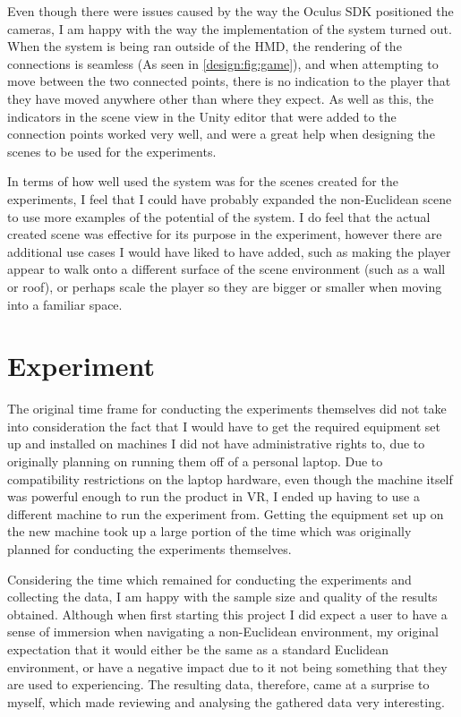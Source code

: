 		Even though there were issues caused by the way the Oculus SDK positioned the cameras, I am happy with the way the implementation of the system turned out.
		When the system is being ran outside of the HMD, the rendering of the connections is seamless (As seen in \autoref{design:fig:game}), and when attempting to move between the two connected points, there is no indication to the player that they have moved anywhere other than where they expect.
		As well as this, the indicators in the scene view in the Unity editor that were added to the connection points worked very well, and were a great help when designing the scenes to be used for the experiments.

		In terms of how well used the system was for the scenes created for the experiments, I feel that I could have probably expanded the non-Euclidean scene to use more examples of the potential of the system.
		I do feel that the actual created scene was effective for its purpose in the experiment, however there are additional use cases I would have liked to have added, such as making the player appear to walk onto a different surface of the scene environment (such as a wall or roof), or perhaps scale the player so they are bigger or smaller when moving into a familiar space. %

	\section{Experiment}

		The original time frame for conducting the experiments themselves did not take into consideration the fact that I would have to get the required equipment set up and installed on machines I did not have administrative rights to, due to originally planning on running them off of a personal laptop.
		Due to compatibility restrictions on the laptop hardware, even though the machine itself was powerful enough to run the product in VR, I ended up having to use a different machine to run the experiment from.
		Getting the equipment set up on the new machine took up a large portion of the time which was originally planned for conducting the experiments themselves.
		
		Considering the time which remained for conducting the experiments and collecting the data, I am happy with the sample size and quality of the results obtained.
		Although when first starting this project I did expect a user to have a sense of immersion when navigating a non-Euclidean environment, my original expectation that it would either be the same as a standard Euclidean environment, or have a negative impact due to it not being something that they are used to experiencing.
		The resulting data, therefore, came at a surprise to myself, which made reviewing and analysing the gathered data very interesting.

